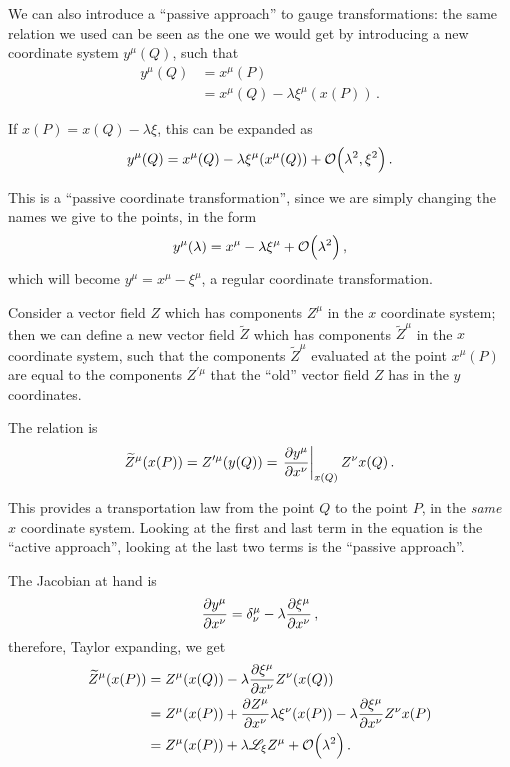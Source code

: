 \documentclass[main.tex]{subfiles}
\begin{document}
We can also introduce a ``passive approach'' to gauge transformations: the same relation we used can be seen as the one we would get by introducing a new coordinate system \(y^{\mu } (Q)\), such that 
%
\begin{align}
y^{\mu } (Q) &= x^{\mu } (P)   \\
&= x^{\mu } (Q) - \lambda \xi^{\mu } (x(P))
\,.
\end{align}

If \(x(P) = x(Q) - \lambda \xi\), this can be expanded as 
%
\begin{align}
y^{\mu } (Q) = x^{\mu } (Q) - \lambda \xi^{\mu } (x^{\mu } (Q)) + \order{\lambda^2, \xi^2}
\,.
\end{align}

This is a ``passive coordinate transformation'', since we are simply changing the names we give to the points, in the form 
%
\begin{align}
y^{\mu } (\lambda ) = x^{\mu } - \lambda \xi^{\mu } + \order{\lambda^2}
\,,
\end{align}
%
which will become \(y^{\mu } = x^{\mu } - \xi^{\mu }\), a regular coordinate transformation. 

Consider a vector field \(Z\) which has components \(Z^{\mu }\) in the \(x\) coordinate system; then we can define a new vector field \(\widetilde{Z}\) which has components \(\widetilde{Z}^{\mu }\) in the \(x\) coordinate system, such that the components \(\widetilde{Z}^{\mu }\) evaluated at the point \(x^{\mu } (P)\) are equal to the components \(Z^{\prime \mu }\) that the ``old'' vector field \(Z\) has in the \(y\) coordinates. 

The relation is 
%
\begin{align}
\widetilde{Z}^{\mu } (x (P)) = Z^{\prime \mu } (y (Q))
= \eval{\pdv{y^{\mu }}{x^{\nu }}}_{x(Q)} Z^{\nu } x(Q)
\,.
\end{align}

This provides a transportation law from the point \(Q\) to the point \(P\), in the \emph{same} \(x\) coordinate system. 
Looking at the first and last term in the equation is the ``active approach'', looking at the last two terms is the ``passive approach''. 

The Jacobian at hand is 
%
\begin{align}
\pdv{y^{\mu }}{x^{\nu }} = \delta^{\mu }_{\nu } - \lambda \pdv{\xi^{\mu }}{x^{\nu }} (x (Q))
\,,
\end{align}
%
therefore, Taylor expanding, we get
%
\begin{align}
\widetilde{Z}^{\mu } (x(P)) &= Z^{\mu } (x(Q)) - \lambda \pdv{\xi^{\mu }}{x^{\nu }} Z^{\nu } (x(Q))  \\
&= Z^{\mu } (x(P)) + \pdv{Z^{\mu }}{x^{\nu }} \lambda \xi^{\nu }(x(P))
- \lambda \pdv{\xi^{\mu }}{x^{\nu }} Z^{\nu } x(P)  \\
&= Z^{\mu } (x(P)) + \lambda \mathscr{L}_\xi Z^{\mu } + \order{\lambda^2}
\,.
\end{align}
\end{document}

